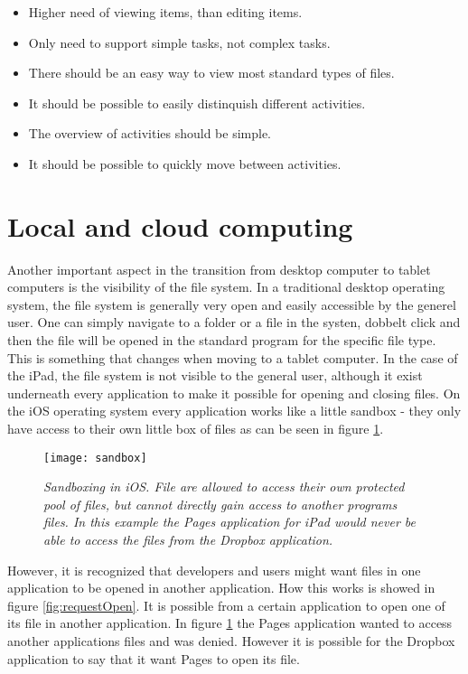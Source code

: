 \begin{itemize}
	\item Higher need of viewing items, than editing items.
	\item Only need to support simple tasks, not complex tasks.
	\item There should be an easy way to view most standard types of files.
	\item It should be possible to easily distinquish different activities.
	\item The overview of activities should be simple.
	\item It should be possible to quickly move between activities.
\end{itemize}

\section{Local and cloud computing}
Another important aspect in the transition from desktop computer to tablet computers is the visibility of the file system. In a traditional desktop operating system, the file system is generally very open and easily accessible by the generel user. One can simply navigate to a folder or a file in the systen, dobbelt click and then the file will be opened in the standard program for the specific file type. This is something that changes when moving to a tablet computer. In the case of the iPad, the file system is not visible to the general user, although it exist underneath every application to make it possible for opening and closing files. On the iOS operating system every application works like a little sandbox - they only have access to their own little box of files as can be seen in figure \ref{fig:sandbox}.

\begin{figure}[ht!]
  \centering
    \texttt{[image: sandbox]}
  \caption{\emph{Sandboxing in iOS. File are allowed to access their own protected pool of files, but cannot directly gain access to another programs files. In this example the Pages application for iPad would never be able to access the files from the Dropbox application.}}
  \label{fig:sandbox}
\end{figure}

However, it is recognized that developers and users might want files in one application to be opened in another application. How this works is showed in figure \ref{fig:requestOpen}. It is possible from a certain application to open one of its file in another application. In figure \ref{fig:sandbox} the Pages application wanted to access another applications files and was denied. However it is possible for the Dropbox application to say that it want Pages to open its file.

